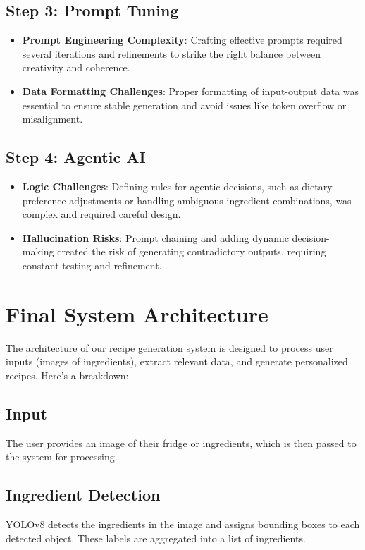 \documentclass[letterpaper,11pt]{report}
\begin{document}
\subsection{Step 3: Prompt Tuning}
\begin{itemize}
    \item \textbf{Prompt Engineering Complexity}: Crafting effective prompts required several iterations and refinements to strike the right balance between creativity and coherence.
    \item \textbf{Data Formatting Challenges}: Proper formatting of input-output data was essential to ensure stable generation and avoid issues like token overflow or misalignment.
\end{itemize}

\subsection{Step 4: Agentic AI}
\begin{itemize}
    \item \textbf{Logic Challenges}: Defining rules for agentic decisions, such as dietary preference adjustments or handling ambiguous ingredient combinations, was complex and required careful design.
    \item \textbf{Hallucination Risks}: Prompt chaining and adding dynamic decision-making created the risk of generating contradictory outputs, requiring constant testing and refinement.
\end{itemize}

\section{Final System Architecture}
The architecture of our recipe generation system is designed to process user inputs (images of ingredients), extract relevant data, and generate personalized recipes. Here’s a breakdown:

\subsection{Input}
The user provides an image of their fridge or ingredients, which is then passed to the system for processing.

\subsection{Ingredient Detection}
YOLOv8 detects the ingredients in the image and assigns bounding boxes to each detected object. These labels are aggregated into a list of ingredients.
\end{document}
